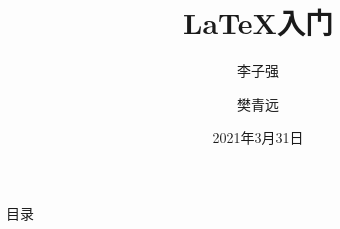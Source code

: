 \documentclass{libs/SUSTech_format}
\title[\LaTeX 入门]{\huge \textbf{\LaTeX 入门}}
\author[CRA 计算机研究协会]{李子强 \inst{1} \and 樊青远 \inst{2}}
\institute[SUSTech]{\inst{1} CSE \and %
                      \inst{2} SME}
\institute[SUSTech]{
    \normalsize
    南方科技大学
}
\date{2021年3月31日}
\begin{document}



{
    \begin{frame}
    \maketitle
    \end{frame}
}

\begin{frame}{目录}
    \begin{multicols}{2}
        \tableofcontents
    \end{multicols}
\end{frame}






\end{document}
